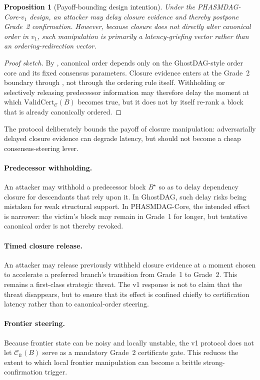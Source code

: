 \documentclass[11pt]{article}
\theoremstyle{definition}
\theoremstyle{plain}
\newtheorem{proposition}[definition]{Proposition}
\theoremstyle{remark}
\newcommand{\Cfr}{\mathcal{C}_{\mathrm{fr}}}
\begin{document}
\begin{proposition}[Payoff-bounding design intention]\label{prop:graceful}
Under the PHASMDAG-Core-$v_1$ design, an attacker may delay closure evidence
and thereby postpone Grade~2 confirmation.
However, because closure does not directly alter canonical order in $v_1$,
such manipulation is primarily a latency-griefing vector rather than an
ordering-redirection vector.
\end{proposition}

\begin{proof}[Proof sketch]
By , canonical order depends only on the
GhostDAG-style order core and its fixed consensus parameters.
Closure evidence enters at the Grade~2 boundary through
, not through the ordering rule itself.
Withholding or selectively releasing predecessor information may therefore
delay the moment at which $\mathrm{ValidCert}_{\mathcal{C}}(B)$ becomes true,
but it does not by itself re-rank a block that is already canonically ordered.
\end{proof}

The protocol deliberately bounds the payoff of closure manipulation:
adversarially delayed closure evidence can degrade latency, but should not
become a cheap consensus-steering lever.

\paragraph{Predecessor withholding.}
An attacker may withhold a predecessor block $B^\star$ so as to delay
dependency closure for descendants that rely upon it.
In GhostDAG, such delay risks being mistaken for weak structural support.
In PHASMDAG-Core, the intended effect is narrower:
the victim's block may remain in Grade~1 for longer, but tentative canonical
order is not thereby revoked.

\paragraph{Timed closure release.}
An attacker may release previously withheld closure evidence at a moment chosen
to accelerate a preferred branch's transition from Grade~1 to Grade~2.
This remains a first-class strategic threat.
The v1 response is not to claim that the threat disappears, but to ensure that
its effect is confined chiefly to certification latency rather than to
canonical-order steering.

\paragraph{Frontier steering.}
Because frontier state can be noisy and locally unstable, the v1 protocol does
not let $\Cfr(B)$ serve as a mandatory Grade~2 certificate gate.
This reduces the extent to which local frontier manipulation can become a
brittle strong-confirmation trigger.
\end{document}
